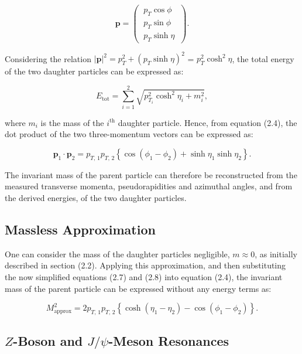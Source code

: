 \documentclass[11pt, a4paper]{article}
\numberwithin{equation}{section}
\begin{document}
\begin{equation} \mathbf{p} = \begin{pmatrix} \: p_{T} \cos{\phi} \: \\ \: p_{T} \sin{\phi} \: \\ \: p_{T} \sinh{\eta} \: \end{pmatrix}. \end{equation}

Considering the relation $|\mathbf{p}|^2 = p_T^2 + (p_T \sinh{\eta})^2$ = $p_T^2 \cosh^2{\eta}$, the total energy of the two daughter particles can be expressed as:

\begin{equation} E_{\text{tot}} = \sum_{i=1}^{2} \sqrt{p_{T_i}^2 \cosh^2{\eta_i} + m_i^2}, \end{equation}

where $m_i$ is the mass of the $i^{\text{th}}$ daughter particle. Hence, from equation (2.4), the dot product of the two three-momentum vectors can be expressed as:

\begin{equation} \mathbf{p}_1 \cdot \mathbf{p}_2 = p_{T,\,1} p_{T,\,2} \left\{ \cos{(\phi_1 - \phi_2)} + \sinh\eta_1 \sinh\eta_2 \right\}. \end{equation}

The invariant mass of the parent particle can therefore be reconstructed from the measured transverse momenta, pseudorapidities and azimuthal angles, and from the derived energies, of the two daughter particles.

\subsection{Massless Approximation}

One can consider the mass of the daughter particles negligible, $m \approx 0$, as initially described in section (2.2). Applying this approximation, and then substituting the now simplified equations (2.7) and (2.8) into equation (2.4), the invariant mass of the parent particle can be expressed without any energy terms as:

\begin{equation} M_{\text{approx}}^2 = 2 p_{T,\,1} p_{T,\,2} \left\{ \cosh(\eta_1 - \eta_2) - \cos(\phi_1 - \phi_2) \right\}. \end{equation}

\subsection{$Z$-Boson and $J/\psi$-Meson Resonances}
\end{document}
